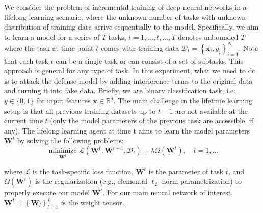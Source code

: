 We consider the problem of incremental training of deep neural networks in a lifelong learning scenario, where the unknown number of tasks with unknown distribution of training data arrive sequentially to the model. Specifically, we aim to learn a model for a series of $T$ tasks, $t = 1, . . . , t, . . . , T$ denotes unbounded $T$ where the task at time point $t$ comes with training data $\mathcal{D}_{t}=\left\{\boldsymbol{x}_{i}, y_{i}\right\}_{i=1}^{N_{t}}$. Note that each task $t$ can be a single task or can consist of a set of subtasks.
This approach is general for any type of task. In this experiment, what we need to do is to attack the defense model by adding interference terms to the original data and turning it into fake data. Briefly, we are binary classification task, i.e. $y \in\{0,1\}$ for input features $\boldsymbol{x} \in \mathbb{R}^{d}$. The main challenge in the lifetime learning setup is that all previous training datasets up to $t-1$ are not available at the current time $t$ (only the model parameters of the previous task are accessible, if any). The lifelong learning agent at time t aims to learn the model parameters $\boldsymbol{W}^{t}$ by solving the following problems:
$$
\underset{\boldsymbol{W}^{t}}{\operatorname{minimize}} \mathcal{L}\left(\boldsymbol{W}^{t} ; \boldsymbol{W}^{t-1}, \mathcal{D}_{t}\right)+\lambda \Omega\left(\boldsymbol{W}^{t}\right), \quad t=1, \ldots
\label{eq:1}
$$

where $\mathcal{L}$ is the task-specific loss function, $\boldsymbol{W}^{t}$ is the parameter of task $t$, and $\Omega\left(\boldsymbol{W}^{t}\right)$ is the regularization (e.g., elemental $\ell_{2}$ norm parametrization) to properly execute our model $\boldsymbol{W}^{t}$. For our main neural network of interest, $\boldsymbol{W}^{t}=\left\{\boldsymbol{W}_{l}\right\}_{l=1}^{L}$ is the weight tensor.

